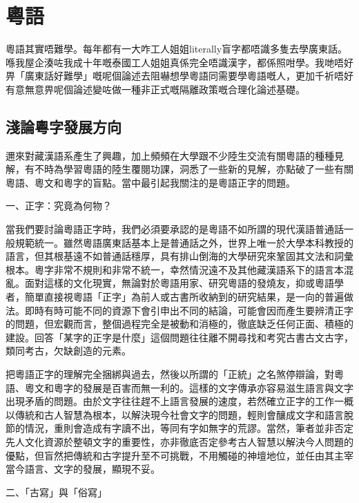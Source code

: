 \chapter{粵語}


粵語其實唔難學。每年都有一大咋工人姐姐literally盲字都唔識多隻去學廣東話。喺我屋企湊咗我成十年嘅泰國工人姐姐真係完全唔識漢字，都係照咁學。我哋唔好畀「廣東話好難學」嘅呢個論述去阻嚇想學粵語同需要學粵語嘅人，更加千祈唔好有意無意畀呢個論述變咗做一種非正式嘅隔離政策嘅合理化論述基礎。


\section{淺論粵字發展方向}

邇來對藏漢語系產生了興趣，加上頻頻在大學跟不少陸生交流有關粵語的種種見解，有不時為學習粵語的陸生覆閱功課，洞悉了一些新的見解，亦點破了一些有關粵語、粵文和粵字的盲點。當中最引起我關注的是粵語正字的問題。

一、正字：究竟為何物？

當我們要討論粵語正字時，我們必須要承認的是粵語不如所謂的現代漢語普通話一般規範統一。雖然粵語廣東話基本上是普通話之外，世界上唯一於大學本科教授的語言，但其根基遠不如普通話穩厚，具有排山倒海的大學研究來鞏固其文法和詞彙根本。粵字非常不規則和非常不統一，幸然情況遠不及其他藏漢語系下的語言本混亂。面對這樣的文化現實，無論對於粵語用家、研究粵語的發燒友，抑或粵語學者，簡單直接視粵語「正字」為前人或古書所收納到的研究結果，是一向的普遍做法。即時有時可能不同的資源下會引申出不同的結論，可能會因而產生要辨清正字的問題，但宏觀而言，整個過程完全是被動和消極的，徹底缺乏任何正面、積極的建設。回答「某字的正字是什麼」這個問題往往離不開尋找和考究古書古文古字，類同考古，欠缺創造的元素。

把粵語正字的理解完全捆綁與過去，然後以所謂的「正統」之名煞停辯論，對粵語、粵文和粵字的發展是百害而無一利的。這樣的文字傳承亦容易滋生語言與文字出現矛盾的問題。由於文字往往趕不上語言發展的速度，若然確立正字的工作一概以傳統和古人智慧為根本，以解決現今社會文字的問題，輕則會釀成文字和語言脫節的情況，重則會造成有字讀不出，等同有字如無字的荒謬。當然，筆者並非否定先人文化資源於整頓文字的重要性，亦非徹底否定參考古人智慧以解決今人問題的優點，但盲然把傳統和古字提升至不可挑戰，不用觸碰的神壇地位，並任由其主宰當今語言、文字的發展，顯現不妥。

二、「古寫」與「俗寫」


